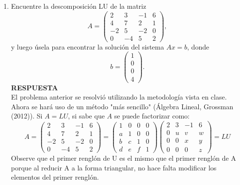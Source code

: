 \documentclass[11pt,letterpaper]{article}
\newcommand{\res}{\textbf{RESPUESTA}\\}
\begin{document}
\begin{enumerate}
\item Encuentre la descomposición LU de la matriz
\begin{equation*}
A=\left(\begin{array}{rrrr}
 2 &  3 & -1 & 6\\
 4 &  7 &  2 & 1\\
-2 &  5 & -2 & 0\\
 0 & -4 &  5 & 2
\end{array} \right),
\end{equation*}
y luego úsela para encontrar la solución del sistema $Ax=b$, donde 
\begin{equation*}
b=\left(\begin{array}{c}
1\\
0\\
0\\
4
\end{array} \right).
\end{equation*}
\res 
El problema anterior se resolvió utilizando la metodología vista en clase. Ahora se hará uso de
un método "más sencillo" (Álgebra Lineal, Grossman (2012)). Si $A =LU$, si sabe que $A$ se puede factorizar como:
\begin{equation*}
A=\left(\begin{array}{rrrr}
 2 &  3 & -1 & 6\\
 4 &  7 &  2 & 1\\
-2 &  5 & -2 & 0\\
 0 & -4 &  5 & 2
\end{array} \right) =
\left(\begin{array}{rrrr}
 1 &  0 &  0 & 0\\
 a &  1 &  0 & 0\\
 b &  c &  1 & 0\\
 d &  e &  f & 1
\end{array} \right) \left(\begin{array}{rrrr}
 2 &  3 & -1 & 6\\
 0 &  u &  v & w\\
 0 &  0 &  x & y\\
 0 &  0 &  0 & z
\end{array} \right)=LU
\end{equation*}
Observe que el primer renglón de U es el mismo que el primer renglón de A porque al reducir A a la forma triangular, no hace falta modificar los elementos del primer renglón.\\

\end{enumerate}
\end{document}
